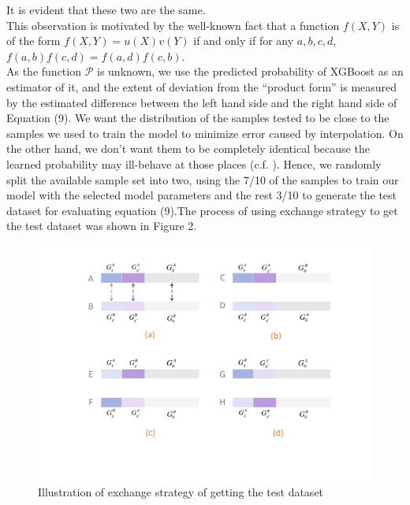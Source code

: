 \documentclass[11pt]{article}
\theoremstyle{plain}
\theoremstyle{definition}
\theoremstyle{remark}
\begin{document}
\noindent It is evident that these two are the same.\\

\noindent This observation is motivated by the well-known fact that a function $f(X,Y)$ is of the form $f(X,Y)=u(X)v(Y)$ if and only if for any $a,b,c,d$, $f(a,b)f(c,d)=f(a,d)f(c,b)$.\\

\noindent As the function $\mathcal{P}$ is unknown, we use the predicted probability of XGBoost as an estimator of it, and the extent of deviation from the ``product form'' is measured by the estimated difference between the left hand side and the right hand side of Equation (9). We want the distribution of the samples tested to be close to the samples we used to train the model to minimize error caused by interpolation. On the other hand, we don't want them to be completely identical because the learned probability may ill-behave at those places (c.f. \cite{13}). Hence, we randomly split the available sample set into two, using the 7/10 of the samples to train our model with the selected model parameters and the rest 3/10 to generate the test dataset for evaluating equation (9).The process of using exchange strategy to get the test dataset was shown in Figure 2.\\

\begin{figure}[H]
    \begin{center}
       \includegraphics[scale=0.6]{exchange.pdf}
    \end{center}
\caption{\label{det}Illustration of exchange strategy of getting the test dataset}
\end{figure}
\end{document}
